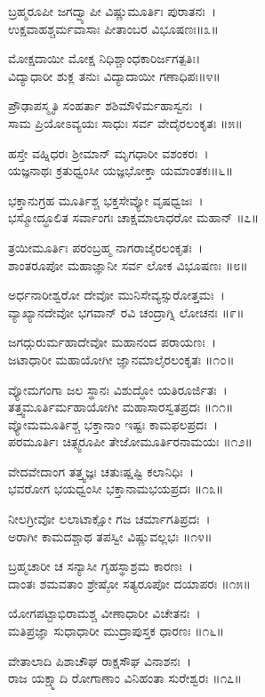 ಬ್ರಹ್ಮರೂಪೀ ಜಗದ್ವ್ಯಾಪೀ ವಿಷ್ಣುಮೂರ್ತಿಃ ಪುರಾತನಃ~।\\
ಉಕ್ಷವಾಹಶ್ಚರ್ಮವಾಸಾಃ ಪೀತಾಂಬರ ವಿಭೂಷಣಃ॥೩॥

ಮೋಕ್ಷದಾಯೀ ಮೋಕ್ಷ ನಿಧಿಶ್ಚಾಂಧಕಾರಿರ್ಜಗತ್ಪತಿಃ।\\
ವಿದ್ಯಾಧಾರೀ ಶುಕ್ಲ ತನುಃ ವಿದ್ಯಾದಾಯೀ ಗಣಾಧಿಪಃ॥೪॥

ಪ್ರೌಢಾಪಸ್ಮೃತಿ ಸಂಹರ್ತಾ ಶಶಿಮೌಳಿರ್ಮಹಾಸ್ವನಃ~।\\
ಸಾಮ ಪ್ರಿಯೋಽವ್ಯಯಃ ಸಾಧುಃ ಸರ್ವ ವೇದೈರಲಂಕೃತಃ ॥೫॥

ಹಸ್ತೇ ವಹ್ನಿಧರಃ ಶ್ರೀಮಾನ್ ಮೃಗಧಾರೀ ವಶಂಕರಃ~।\\
ಯಜ್ಞನಾಥಃ ಕ್ರತುಧ್ವಂಸೀ ಯಜ್ಞಭೋಕ್ತಾ ಯಮಾಂತಕಃ॥೬॥

ಭಕ್ತಾನುಗ್ರಹ ಮೂರ್ತಿಶ್ಚ ಭಕ್ತಸೇವ್ಯೋ ವೃಷಧ್ವಜಃ~।\\
ಭಸ್ಮೋದ್ಧೂಲಿತ ಸರ್ವಾಂಗಃ ಚಾಕ್ಷಮಾಲಾಧರೋ ಮಹಾನ್ ॥೭॥

ತ್ರಯೀಮೂರ್ತಿಃ ಪರಂಬ್ರಹ್ಮ ನಾಗರಾಜೈರಲಂಕೃತಃ~।\\
ಶಾಂತರೂಪೋ ಮಹಾಜ್ಞಾನೀ ಸರ್ವ ಲೋಕ ವಿಭೂಷಣಃ ॥೮॥

ಅರ್ಧನಾರೀಶ್ವರೋ ದೇವೋ ಮುನಿಸೇವ್ಯಸ್ಸುರೋತ್ತಮಃ~।\\
ವ್ಯಾಖ್ಯಾನದೇವೋ ಭಗವಾನ್ ರವಿ ಚಂದ್ರಾಗ್ನಿ ಲೋಚನಃ ॥೯॥

ಜಗದ್ಗುರುರ್ಮಹಾದೇವೋ ಮಹಾನಂದ ಪರಾಯಣಃ~।\\
ಜಟಾಧಾರೀ ಮಹಾಯೋಗೀ ಜ್ಞಾನಮಾಲೈರಲಂಕೃತಃ ॥೧೦॥

ವ್ಯೋಮಗಂಗಾ ಜಲ ಸ್ಥಾನಃ ವಿಶುದ್ಧೋ ಯತಿರೂರ್ಜಿತಃ~।\\
ತತ್ತ್ವಮೂರ್ತಿರ್ಮಹಾಯೋಗೀ ಮಹಾಸಾರಸ್ವತಪ್ರದಃ ॥೧೧॥\\

ವ್ಯೋಮಮೂರ್ತಿಶ್ಚ ಭಕ್ತಾನಾಂ ಇಷ್ಟಃ ಕಾಮಫಲಪ್ರದಃ~।\\
ಪರಮೂರ್ತಿಃ ಚಿತ್ಸ್ವರೂಪೀ ತೇಜೋಮೂರ್ತಿರನಾಮಯಃ ॥೧೨॥

ವೇದವೇದಾಂಗ ತತ್ತ್ವಜ್ಞಃ ಚತುಃಷ್ಷಷ್ಟಿ ಕಲಾನಿಧಿಃ~।\\
ಭವರೋಗ ಭಯಧ್ವಂಸೀ ಭಕ್ತಾನಾಮಭಯಪ್ರದಃ ॥೧೩॥

ನೀಲಗ್ರೀವೋ ಲಲಾಟಾಕ್ಷೋ ಗಜ ಚರ್ಮಾಗತಿಪ್ರದಃ~।\\
ಅರಾಗೀ ಕಾಮದಶ್ಚಾಥ ತಪಸ್ವೀ ವಿಷ್ಣುವಲ್ಲಭಃ ॥೧೪॥

ಬ್ರಹ್ಮಚಾರೀ ಚ ಸನ್ಯಾಸೀ ಗೃಹಸ್ಥಾಶ್ರಮ ಕಾರಣಃ~।\\
ದಾಂತಃ ಶಮವತಾಂ ಶ್ರೇಷ್ಠೋ ಸತ್ಯರೂಪೋ ದಯಾಪರಃ ॥೧೫॥

ಯೋಗಪಟ್ಟಾಭಿರಾಮಶ್ಚ ವೀಣಾಧಾರೀ ವಿಚೇತನಃ~।\\
ಮತಿಪ್ರಜ್ಞಾ ಸುಧಾಧಾರೀ ಮುದ್ರಾಪುಸ್ತಕ ಧಾರಣಃ ॥೧೬॥

ವೇತಾಲಾದಿ ಪಿಶಾಚೌಘ ರಾಕ್ಷಸೌಘ ವಿನಾಶನಃ~।\\
ರಾಜ ಯಕ್ಷ್ಮಾದಿ ರೋಗಾಣಾಂ ವಿನಿಹಂತಾ ಸುರೇಶ್ವರಃ ॥೧೭॥
